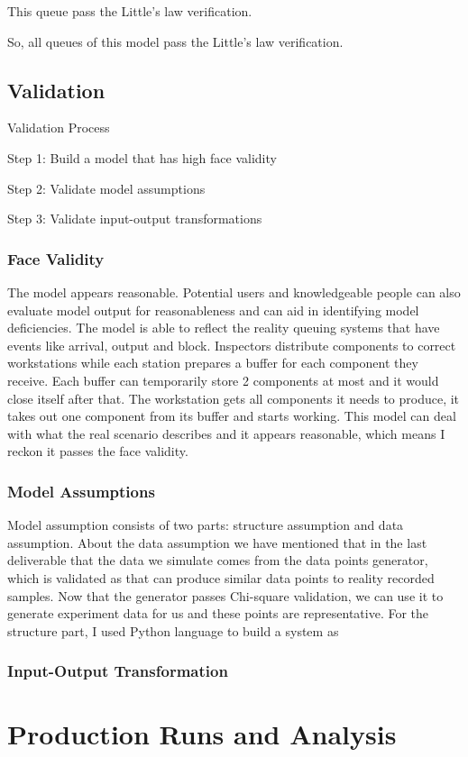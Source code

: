\documentclass{article}
\begin{document}
This queue pass the Little's law verification.

So, all queues of this model pass the Little's law verification.

\subsection{Validation}

Validation Process

Step 1: Build a model that has high face validity

Step 2: Validate model assumptions

Step 3: Validate input-output transformations

\subsubsection{Face Validity}

The model appears reasonable. Potential users and knowledgeable people can also evaluate model output for reasonableness and can aid in identifying model deficiencies. The model is able to reflect the reality queuing systems that have events like arrival, output and block. Inspectors distribute components to correct workstations while each station prepares a buffer for each component they receive. Each buffer can temporarily store 2 components at most and it would close itself after that. The workstation gets all components it needs to produce, it takes out one component from its buffer and starts working. This model can deal with what the real scenario describes and it appears reasonable, which means I reckon it passes the face validity. 


\subsubsection{Model Assumptions}

Model assumption consists of two parts: structure assumption and data assumption. About the data assumption we have mentioned that in the last deliverable that the data we simulate comes from the data points generator, which is validated as that can produce similar data points to reality recorded samples. Now that the generator passes Chi-square validation, we can use it to generate experiment data for us and these points are representative. For the structure part, I used Python language to build a system as 

\subsubsection{Input-Output Transformation}

\section{Production Runs and Analysis}
\end{document}
